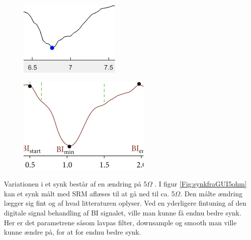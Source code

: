 \begin{figure}[H]
\centering
\begin{minipage}{.5\textwidth}
  \centering
  \includegraphics[width=.8\linewidth]{Figure/synkfraGUI}
  \label{fig:synkfraGUI}
\end{minipage}%
\begin{minipage}{.5\textwidth}
  \centering
  \includegraphics[width=.8\linewidth]{Figure/synkfraArtikel}
  \label{fig:synkfraArtikel}
\end{minipage}
\end{figure}

Variationen i et synk består af en ændring på 5$\Omega$ \cite[s. 49]{Chester2014}. I figur \ref{Fig:synkfraGUI5ohm} kan et synk målt med SRM aflæses til at gå ned til ca. 5$\Omega$. Den målte ændring lægger sig fint og af hvad litteraturen oplyser. Ved en yderligere fintuning af den digitale signal behandling af BI signalet, ville man kunne få endnu bedre synk. Her er det parametrene såsom lavpas filter, downsample og smooth man ville kunne ændre på, for at for endnu bedre synk.

